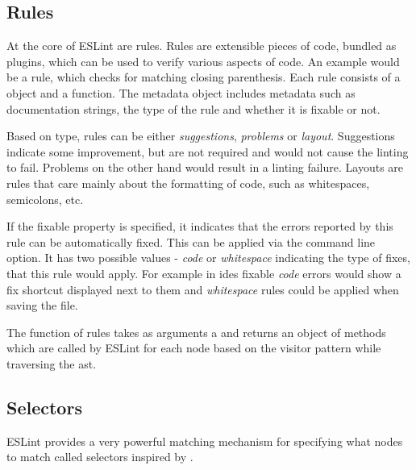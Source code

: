 \subsection{Rules}
At the core of ESLint are rules. Rules are extensible pieces of code, bundled as plugins, which can be used to verify various aspects of code. An example would be a rule, which checks for matching closing parenthesis. 
Each rule consists of a  object
and a  function. The metadata object includes metadata such as documentation strings, the type of the rule and whether it is fixable or not.

Based on type, rules can be either \textit{suggestions}, \textit{problems} or \textit{layout}. Suggestions indicate some improvement, but are not required and would not cause the linting to fail. Problems on the other hand would result in a linting failure. Layouts are rules that care mainly about the formatting of code, such as whitespaces, semicolons, etc. 

If the fixable property is specified, it indicates that the errors reported by this rule can be automatically fixed. This can be applied via the  command line option. It has two possible values - \textit{code} or \textit{whitespace} indicating the type of fixes, that this rule would apply. For example in \glspl{ide} fixable \textit{code} errors would show a fix shortcut displayed next to them and \textit{whitespace} rules could be applied when saving the file.

The  function of rules takes as arguments a  and returns an object of methods which are called by ESLint for each node based on the \gls{visitor} pattern while traversing the \gls{ast}. 

\subsection{Selectors}
ESLint provides a very powerful matching mechanism for specifying what nodes to match called selectors \parencite{eslintSelectors} inspired by \textcite{estoolsEsQuery}.

